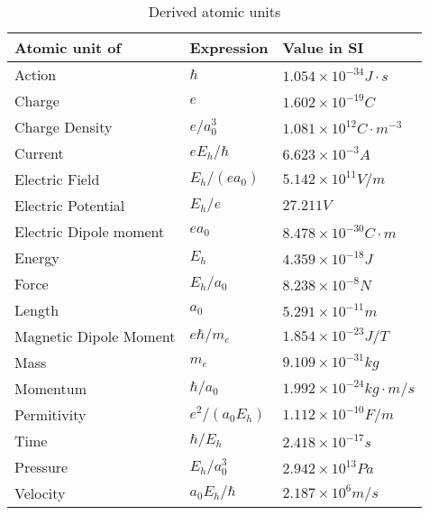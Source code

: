 \documentclass{article}
\begin{document}
\begin{table}[h]
    \centering
    \caption{Derived atomic units}
    \begin{tabular}{|l|l|l|}
        \hline
        \textbf{Atomic unit of} & \textbf{Expression} & \textbf{Value in SI} \\ \hline
        Action                  & $\hbar$           & $1.054\times 10^{-34} J\cdot s$ \\ \hline
        Charge                  & $e$               & $1.602\times 10^{-19} C$ \\ \hline
        Charge Density          & $e/a_0^3$         & $1.081\times 10^12 C\cdot m^{-3}$ \\ \hline
        Current                 & $eE_h/\hbar$      & $6.623\times 10^{-3} A$ \\ \hline
        Electric Field          & $E_h/(ea_0)$      & $5.142\times 10^11 V/m $ \\ \hline
        Electric Potential      & $E_h/e$           & $27.211V $ \\ \hline
        Electric Dipole moment  & $ea_0$            & $8.478\times 10^{-30} C\cdot m $ \\ \hline
        Energy                  & $E_h$             & $4.359\times 10^{-18} J $ \\ \hline
        Force                   & $E_h/a_0$         & $8.238\times 10^{-8} N$ \\ \hline
        Length                  & $a_0$             & $5.291\times 10^{-11} m $ \\ \hline
        Magnetic Dipole Moment  & $e\hbar/m_e$      & $1.854\times 10^{-23} J/T$ \\ \hline
        Mass                    & $m_e$             & $9.109\times 10^{-31} kg $ \\ \hline
        Momentum                & $\hbar/a_0$       & $1.992\times 10^{-24} kg\cdot m/s $ \\ \hline
        Permitivity             & $e^2/(a_0E_h)$    & $1.112\times 10^{-10} F/m$ \\ \hline
        Time                    & $\hbar/E_h$       & $2.418\times 10^{-17} s $ \\ \hline   
        Pressure                & $E_h/a_0^3$       & $2.942\times 10^{13} Pa $ \\ \hline
        Velocity                & $a_0E_h/\hbar$    & $2.187\times 10^6 m/s $ \\ \hline
    \end{tabular}
\end{table}
\end{document}
